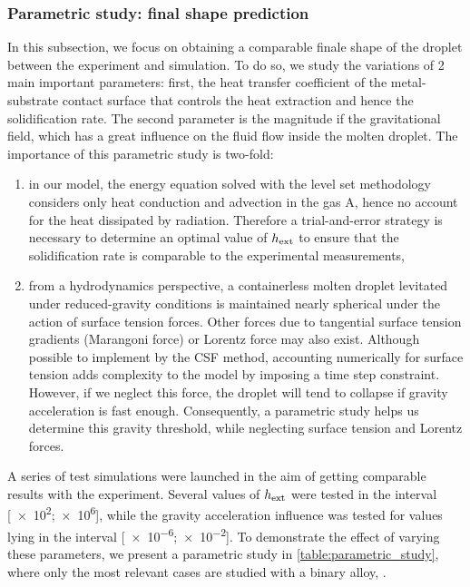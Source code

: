 \subsubsection{Parametric study: final shape prediction}

In this subsection, we focus on obtaining a comparable finale shape of the droplet between the experiment and simulation.
To do so, we study the variations of 2 main important parameters: first, the heat transfer coefficient of the metal-substrate contact surface that controls the heat extraction and hence the solidification rate. 
The second parameter is the magnitude if the gravitational field,
which has a great influence on the fluid flow inside the molten droplet.
The importance of this parametric study is two-fold: 
\begin{enumerate}
\itemsep0em

\item in our model, the energy equation solved with the level set methodology considers only heat conduction 
and advection in the gas A, hence no account for the heat dissipated by radiation.
Therefore a trial-and-error strategy is necessary to determine an optimal value of $h_{\text{ext}}$ 
to ensure that the solidification rate is comparable to the experimental measurements,

\item from a hydrodynamics perspective, a containerless molten droplet levitated under reduced-gravity conditions is maintained nearly spherical 
under the action of surface tension forces. Other forces due to tangential surface tension gradients (Marangoni force) or Lorentz force may also exist.
Although possible to implement by the CSF method, accounting numerically for surface tension adds complexity to the model by imposing
a time step constraint. However, if we neglect this force, the droplet will tend to collapse if gravity acceleration is fast enough.
Consequently, a parametric study helps us determine this gravity threshold, while neglecting surface tension and Lorentz forces. 
\end{enumerate}

A series of test simulations were launched in the aim of getting comparable results with the experiment.
Several values of $h_{\text{ext}}$ were tested in the interval [\num{e2};\num{e6}]\si{\uhconvec}, while the gravity acceleration influence was tested
for values lying in the interval [\num{e-6};\num{e-2}]\si{\uacceleration}. 
To demonstrate the effect of varying these parameters, we present a parametric study in \cref{table:parametric_study}, where only the most relevant cases are studied with
a binary alloy, .

